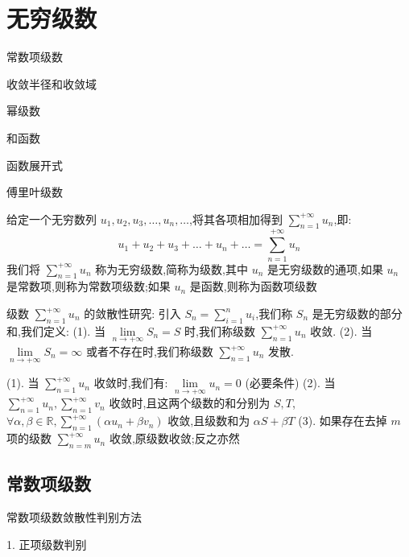 \chapter{无穷级数}
\begin{introduction}
	\item 常数项级数
	\item 收敛半径和收敛域
	\item 幂级数
	\item 和函数
	\item 函数展开式
	\item 傅里叶级数
\end{introduction}
\begin{definition}
	给定一个无穷数列 $u_{1},u_{2},u_{3},\dots,u_{n},\dots$,将其各项相加得到 $\sum\limits_{n=1}^{+\infty}u_{n}$,即:
	$$u_{1}+u_{2}+u_{3}+\dots+u_{n}+\dots=\sum_{n=1}^{+\infty}u_{n}$$
	我们将 $\sum\limits_{n=1}^{+\infty}u_{n}$ 称为无穷级数,简称为级数,其中 $u_{n}$ 是无穷级数的通项,如果 $u_{n}$ 是常数项,则称为常数项级数;如果 $u_{n}$ 是函数,则称为函数项级数
\end{definition}
\begin{definition}[级数敛散性]
	级数 $\sum\limits_{n=1}^{+\infty}u_{n}$ 的敛散性研究:
	引入 $S_{n}=\sum\limits_{i=1}^{n}u_{i}$,我们称 $S_{n}$ 是无穷级数的部分和,我们定义:
	(1). 当 $\lim\limits_{n\rightarrow +\infty}S_{n}=S$ 时,我们称级数 $\sum\limits_{n=1}^{+\infty}u_{n}$ 收敛.
	(2). 当 $\lim\limits_{n\rightarrow +\infty}S_{n}=\infty$ 或者不存在时,我们称级数 $\sum\limits_{n=1}^{+\infty}u_{n}$ 发散.
\end{definition}
\begin{corollary}
	(1). 当 $\sum\limits_{n=1}^{+\infty}u_{n}$ 收敛时,我们有:  $\lim\limits_{n\rightarrow +\infty}u_{n}=0$ (必要条件)
	(2). 当 $\sum\limits_{n=1}^{+\infty}u_{n},\sum\limits_{n=1}^{+\infty}v_{n}$ 收敛时,且这两个级数的和分别为 $S,T$, $\forall \alpha ,\beta \in \mathbb{R} ,\sum\limits_{n=1}^{+\infty}(\alpha u_{n}+\beta v_{n})$ 收敛,且级数和为 $\alpha S+\beta T$
	(3). 如果存在去掉 $m$ 项的级数 $\sum\limits_{n=m}^{+\infty}u_{n}$ 收敛,原级数收敛;反之亦然
\end{corollary}
\section{常数项级数}

常数项级数敛散性判别方法

1. 正项级数判别

